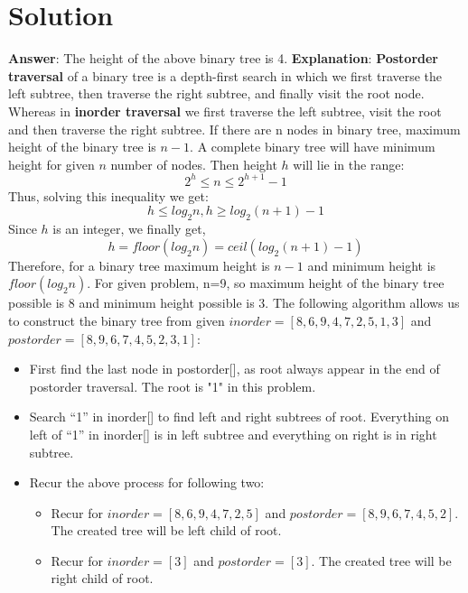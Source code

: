 \documentclass[journal,12pt,twocolumn]{IEEEtran}
\begin{document}
\section{Solution}
\textbf{Answer}: The height of the above binary tree is 4.
\newline
\textbf{Explanation}: \textbf{Postorder traversal} of a binary tree is a depth-first search in which we first traverse the left subtree, then traverse the right subtree, and finally visit the root node. Whereas in \textbf{inorder traversal} we first traverse the left subtree, visit the root and then traverse the right subtree.
\newline
If there are n nodes in binary tree, maximum height of the binary tree is \textbf{$n-1$}.
\newline
A complete binary tree will have minimum height for given $n$ number of nodes. Then height $h$ will lie in the range:
\begin{equation}
\label{eq:eqn1}
 2^h \leq n \leq 2^{h+1} - 1
\end{equation}
Thus, solving this inequality we get:
\begin{equation}
\label{eq:eqn2}
 h \leq log_{2}n,  h \geq log_{2}(n+1) - 1
\end{equation}
Since $h$ is an integer, we finally get,
\begin{equation}
\label{eq:eqn3}
 h = floor(log_{2}n) = ceil(log_{2}(n+1) - 1)
\end{equation}
Therefore, for a binary tree maximum height is \textbf{$n-1$} and minimum height is \textbf{$floor(log_{2}n)$}.
For given problem, n=9, so maximum height of the binary tree possible is 8 and minimum height possible is 3. 
\newline
The following algorithm allows us to construct the binary tree from given $inorder = [8,6,9,4,7,2,5,1,3]$ and $postorder = [8,9,6,7,4,5,2,3,1]$:
\begin{itemize}
    \item  First find the last node in postorder[], as root always appear in the end of postorder traversal. The root is "1" in this problem.
    \item  Search “1” in inorder[] to find left and right subtrees of root. Everything on left of “1” in inorder[] is in left subtree and everything on right is in right subtree. 
    \item Recur the above process for following two:
    \begin{itemize}
        \item Recur for $inorder = [8,6,9,4,7,2,5]$ and $postorder = [8,9,6,7,4,5,2]$. The created tree will be left child of root.
        \item Recur for $inorder = [3]$ and $postorder = [3]$. The created tree will be right child of root.
    \end{itemize}
\end{itemize}
\end{document}

